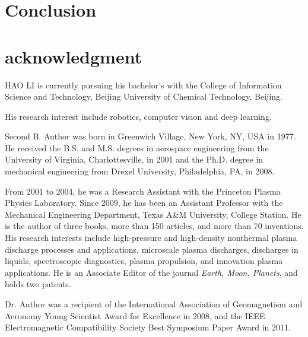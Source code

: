 \documentclass{ieeeaccess}
\begin{document}
\section{Conclusion}

\section{acknowledgment}




\begin{IEEEbiography}{HAO LI} 
  is currently pursuing his bachelor's with the College of Information Science and Technology, Beijing University of Chemical Technology, Beijing.

  His research interest include robotics, computer vision and deep learning.
\end{IEEEbiography}

\begin{IEEEbiography}{Second B. Author} was born in Greenwich Village, New York, NY, USA in 
1977. He received the B.S. and M.S. degrees in aerospace engineering from 
the University of Virginia, Charlottesville, in 2001 and the Ph.D. degree in 
mechanical engineering from Drexel University, Philadelphia, PA, in 2008.

From 2001 to 2004, he was a Research Assistant with the Princeton Plasma 
Physics Laboratory. Since 2009, he has been an Assistant Professor with the 
Mechanical Engineering Department, Texas A{\&}M University, College Station. 
He is the author of three books, more than 150 articles, and more than 70 
inventions. His research interests include high-pressure and high-density 
nonthermal plasma discharge processes and applications, microscale plasma 
discharges, discharges in liquids, spectroscopic diagnostics, plasma 
propulsion, and innovation plasma applications. He is an Associate Editor of 
the journal \emph{Earth, Moon, Planets}, and holds two patents. 

Dr. Author was a recipient of the International Association of Geomagnetism 
and Aeronomy Young Scientist Award for Excellence in 2008, and the IEEE 
Electromagnetic Compatibility Society Best Symposium Paper Award in 2011. 
\end{IEEEbiography}


\EOD
\end{document}
